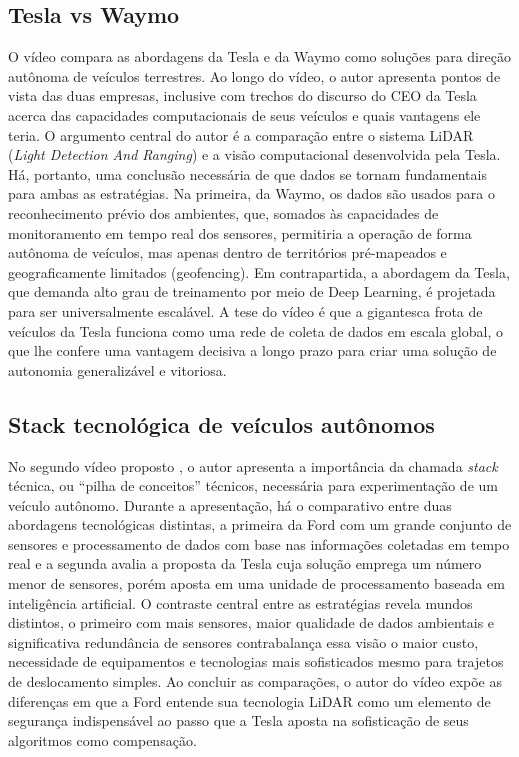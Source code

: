 \subsection{Tesla vs Waymo}

O vídeo \parencite{cleanerwatt} compara as abordagens da Tesla e da Waymo como soluções para direção autônoma de veículos terrestres. Ao longo do vídeo, o autor apresenta pontos de vista das duas empresas, inclusive com trechos do discurso do CEO da Tesla acerca das capacidades computacionais de seus veículos e quais vantagens ele teria. O argumento central do autor é a comparação entre o sistema LiDAR (\textit{Light Detection And Ranging}) e a visão computacional desenvolvida pela Tesla. Há, portanto, uma conclusão necessária de que dados se tornam fundamentais para ambas as estratégias. Na primeira, da Waymo, os dados são usados para o reconhecimento prévio dos ambientes, que, somados às capacidades de monitoramento em tempo real dos sensores, permitiria a operação de forma autônoma de veículos, mas apenas dentro de territórios pré-mapeados e geograficamente limitados (geofencing). Em contrapartida, a abordagem da Tesla, que demanda alto grau de treinamento por meio de Deep Learning, é projetada para ser universalmente escalável. A tese do vídeo é que a gigantesca frota de veículos da Tesla funciona como uma rede de coleta de dados em escala global, o que lhe confere uma vantagem decisiva a longo prazo para criar uma solução de autonomia generalizável e vitoriosa.

\subsection{Stack tecnológica de veículos autônomos}

No segundo vídeo proposto \parencite{frankyoutube}, o autor apresenta a importância da chamada \textit{stack} técnica, ou ``pilha de conceitos'' técnicos, necessária para experimentação de um veículo autônomo. Durante a apresentação, há o comparativo entre duas abordagens tecnológicas distintas, a primeira da Ford com um grande conjunto de sensores e processamento de dados com base nas informações coletadas em tempo real e a segunda avalia a proposta da Tesla cuja solução emprega um número menor de sensores, porém aposta em uma unidade de processamento baseada em inteligência artificial. O contraste central entre as estratégias revela mundos distintos, o primeiro com mais sensores, maior qualidade de dados ambientais e significativa redundância de sensores contrabalança essa visão o maior custo, necessidade de equipamentos e tecnologias mais sofisticados mesmo para trajetos de deslocamento simples. Ao concluir as comparações, o autor do vídeo expõe as diferenças em que a Ford entende sua tecnologia LiDAR como um elemento de segurança indispensável ao passo que a Tesla aposta na sofisticação de seus algoritmos como compensação.

